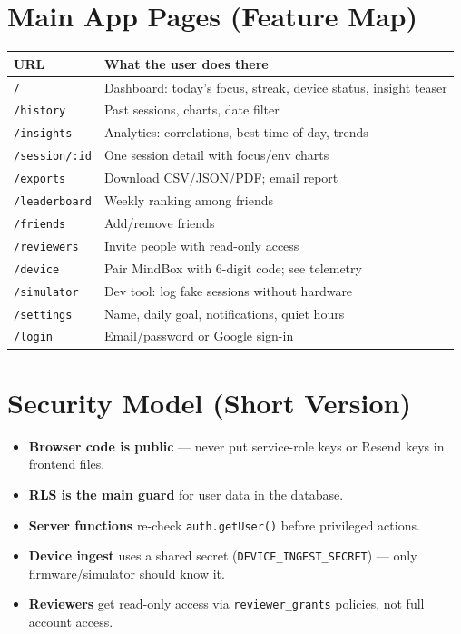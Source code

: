 \documentclass[11pt,a4paper]{article}
\newcommand{\filepath}[1]{\texttt{#1}}
\begin{document}
\section{Main App Pages (Feature Map)}

\begin{table}[h]
\centering
\small
\begin{tabular}{@{}ll@{}}
\toprule
URL & What the user does there \\
\midrule
\filepath{/} & Dashboard: today's focus, streak, device status, insight teaser \\
\filepath{/history} & Past sessions, charts, date filter \\
\filepath{/insights} & Analytics: correlations, best time of day, trends \\
\filepath{/session/:id} & One session detail with focus/env charts \\
\filepath{/exports} & Download CSV/JSON/PDF; email report \\
\filepath{/leaderboard} & Weekly ranking among friends \\
\filepath{/friends} & Add/remove friends \\
\filepath{/reviewers} & Invite people with read-only access \\
\filepath{/device} & Pair MindBox with 6-digit code; see telemetry \\
\filepath{/simulator} & Dev tool: log fake sessions without hardware \\
\filepath{/settings} & Name, daily goal, notifications, quiet hours \\
\filepath{/login} & Email/password or Google sign-in \\
\bottomrule
\end{tabular}
\end{table}

\section{Security Model (Short Version)}

\begin{itemize}[leftmargin=*]
  \item \textbf{Browser code is public} --- never put service-role keys or Resend keys in frontend files.
  \item \textbf{RLS is the main guard} for user data in the database.
  \item \textbf{Server functions} re-check \texttt{auth.getUser()} before privileged actions.
  \item \textbf{Device ingest} uses a shared secret (\texttt{DEVICE\_INGEST\_SECRET}) --- only firmware/simulator should know it.
  \item \textbf{Reviewers} get read-only access via \texttt{reviewer\_grants} policies, not full account access.
\end{itemize}
\end{document}
